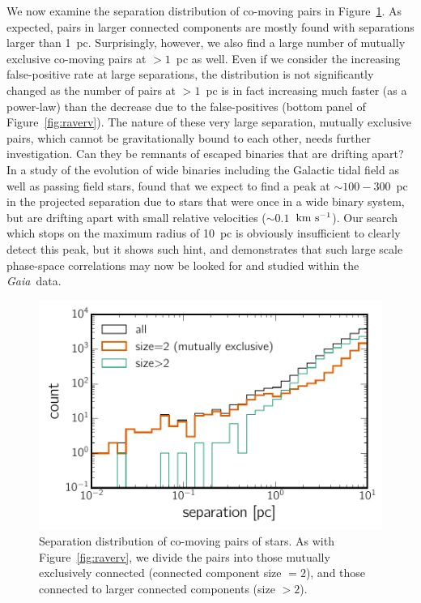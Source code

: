 \documentclass[manuscript, letterpaper]{aastex6}
\newcommand{\project}[1]{\textsl{#1}}
\newcommand{\gaia}{\project{Gaia}}
\newcommand{\kms}{\ensuremath{\rm km~s^{-1}}}
\begin{document}
We now examine the separation distribution of co-moving pairs in
Figure~\ref{fig:hist_separation}.
As expected, pairs in larger connected components are mostly
found with separations larger than 1~pc.
Surprisingly, however, we also find a large number of mutually exclusive co-moving
pairs
at $>1$~pc as well. Even if we consider the increasing false-positive rate at large
separations, the distribution is not significantly changed as the number of pairs
at $>1$~pc is in fact increasing much faster (as a power-law)
than the decrease due to the false-positives
(bottom panel of Figure~\ref{fig:raverv}).
The nature of these very large separation, mutually exclusive pairs,
which cannot be gravitationally bound to each other, needs further investigation.
Can they be remnants of escaped binaries that are drifting apart?
In a study of the evolution of wide binaries including the Galactic tidal field
as well as passing field stars, \citet{Jiang:2010aa} found that we expect
to find a peak at $\sim 100-300$~pc in the projected separation due to
stars that were once in a wide binary system, but are drifting apart with small
relative velocities ($\sim 0.1$~\kms).
Our search which stops on the maximum radius of 10~pc is obviously insufficient
to clearly detect this peak, but it shows such hint, and demonstrates
that such large scale phase-space correlations may now be looked for and studied within the \gaia\ data.

\begin{figure}[htbp]
  \begin{center}
    \includegraphics[width=\textwidth]{figures/hist_sep.pdf}
  \end{center}
  \caption{%
    Separation distribution of co-moving pairs of stars.
    As with Figure~\ref{fig:raverv},
    we divide the pairs into those mutually exclusively connected
    (connected component size $=2$), and those connected to larger connected components (size $>2$).
    \label{fig:hist_separation}
    }
\end{figure}
\end{document}
